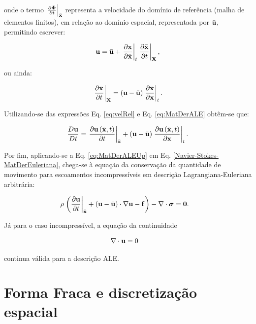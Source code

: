 \documentclass[tese_patricia]{subfiles}%
\begin{document}
\noindent onde o termo $\left. \frac{\partial \bar{\mathbf{\Phi}}}{\partial t} \right|_{\bar{\mathbf{x}}}$ representa a velocidade do domínio de referência (malha de elementos finitos), em relação ao domínio espacial, representada por $\bar{\mathbf{u}}$, permitindo escrever: 

\begin{align}
\mathbf{u} = \bar{\mathbf{u}} + \left . \frac{\partial \mathbf{x}}{\partial \bar{\mathbf{x}}} \right|_{t} \left . \frac{\partial \bar{\mathbf{x}}}{\partial t} \right|_{\mathbf{X}},
\end{align}

\noindent ou ainda:

\begin{align}
\left . \frac{\partial \bar{\mathbf{x}}}{\partial t} \right|_{\mathbf{X}} = \left( \mathbf{u} - \bar{\mathbf{u}} \right) \left. \frac{\partial \bar{\mathbf{x}}}{\partial \mathbf{x}} \right |_{t}. \label{eq:velRel}
 \end{align}
 
Utilizando-se das expressões Eq. \eqref{eq:velRel} e Eq. \eqref{eq:MatDerALE} obtêm-se que: 
 
\begin{align}
\frac{D\mathbf{u}}{Dt} = \left. \frac{\partial\mathbf{u}\left(\bar{\mathbf{x}},t\right)}{\partial t} \right|_{\bar{\mathbf{x}}} +  \left( \mathbf{u} - \bar{\mathbf{u}} \right) \left. \frac{\partial\mathbf{u}\left(\bar{\mathbf{x}},t\right)}{\partial \mathbf{x}} \right|_{t}. \label{eq:MatDerALEUp}
\end{align}

Por fim, aplicando-se a Eq. \eqref{eq:MatDerALEUp} em Eq. \ref{Navier-Stokes-MatDerEuleriana}, chega-se à equação da conservação da quantidade de movimento para escoamentos incompressíveis em descrição Lagrangiana-Euleriana arbitrária:

\begin{align}
\rho \left . \left(\frac{\partial\mathbf{u}}{\partial t} \right|_{\bar{\mathbf{x}}} + \left(\mathbf{u} - \bar{\mathbf{u}}\right)\cdot\nabla\mathbf{u} - \mathbf{f} \right) - \nabla \cdot \boldsymbol{\sigma} &= \mathbf{0}.  \label{eq:Navier-Stokes-ALE} 
\end{align}

Já para o caso incompressível, a equação da continuidade 

\begin{align}
\nabla \cdot \mathbf{u} &= 0 \label{eq:Continuity}
\end{align}

\noindent continua válida para a descrição ALE.


\section{Forma Fraca e discretização espacial}
\end{document}
